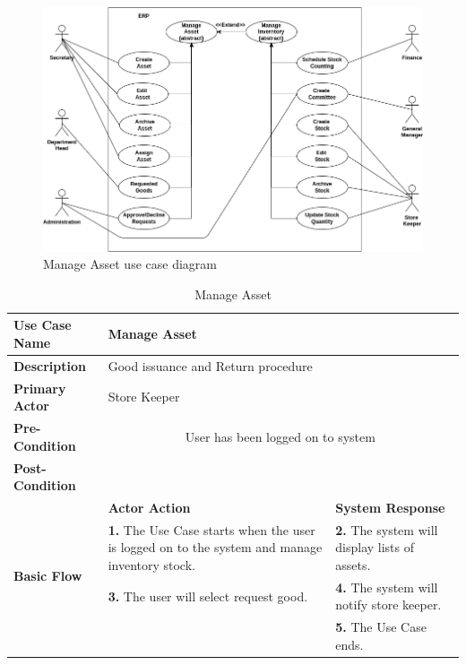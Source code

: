 \clearpage
\begin{figure}[!ht]
\centering
\includegraphics[width=15cm,keepaspectratio]{usecases/asset.drawio.png}
\caption{Manage Asset use case diagram }
\end{figure}

\begin{table}[!h]
\begin{tabular}{|l|p{6cm}|p{6cm}|}
\hline 
\rule[-1ex]{0pt}{2.5ex} \textbf{Use Case Name} & \multicolumn{2}{p{10cm}|}{Manage Asset} \\ 
\hline 
\rule[-1ex]{0pt}{2.5ex} \textbf{Description} &\multicolumn{2}{p{10cm}|}{Good issuance
and Return procedure} \\ 
\hline 
\rule[-1ex]{0pt}{2.5ex} \textbf{Primary Actor}& \multicolumn{2}{p{10cm}|}{Store Keeper} \\ 
\hline 
\rule[-1ex]{0pt}{2.5ex} \textbf{Pre-Condition} & \multicolumn{2}{c|}{User has been logged on to system} \\ 
\hline 
\rule[-1ex]{0pt}{2.5ex} \textbf{Post-Condition} & \multicolumn{2}{p{10cm}|}{}  \\ 
\hline 
\multirow{4}{*}{\textbf{Basic Flow}} & \textbf{Actor Action} & \textbf{System Response}\\
\cline{2-3}
%
&
\textbf{1.}  The Use Case starts when the user is logged on to the system and manage inventory stock.
& 
\textbf{2.}  The system will display lists of assets.
\\
%
&
\textbf{3.}  The user will select request good.
& 
\textbf{4.}  The system will notify store keeper. 
\\
%
&

& 
\textbf{5.}  The Use Case ends. 
\\
\hline
\end{tabular}
\caption{Manage Asset} 
\end{table}

